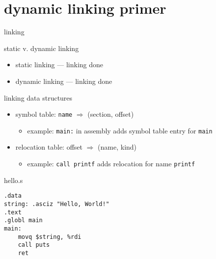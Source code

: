 \section{dynamic linking primer}

\begin{frame}{linking}
\end{frame}

\begin{frame}{static v. dynamic linking}
    \begin{itemize}
    \item static linking --- linking done 
    \item dynamic linking --- linking done 
    \end{itemize}
\end{frame}

\begin{frame}{linking data structures}
    \begin{itemize}
    \item symbol table: {\tt name} $\Rightarrow$ (section, offset)
        \begin{itemize}
        \item example: {\tt main:} in assembly adds symbol table entry for {\tt main}
        \end{itemize}
    \item relocation table: offset $\Rightarrow$ (name, kind)
        \begin{itemize}
        \item example: {\tt call printf} adds relocation for name {\tt printf}
        \end{itemize}
    \end{itemize}
\end{frame}

\begin{frame}[fragile,label=linkingExAsm]{hello.s}
\begin{lstlisting}
.data
string: .asciz "Hello, World!"
.text
.globl main
main:
    movq $string, %rdi
    call puts
    ret
\end{lstlisting}
\end{frame}

